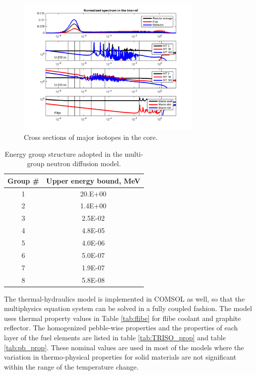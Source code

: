 \documentclass{elsarticle}
\begin{document}
\begin{figure}[h]
  \centering
  \includegraphics[width=0.8\textwidth]{./images/diffusion/tmsr/isotope_XS.png}
  \caption{Cross sections of major isotopes in the core.}
  \label{fig:xs_isotope}
\end{figure}

\begin{table}
\caption{Energy group structure adopted in the multi-group neutron diffusion model.}
  \centering
  \begin{tabular}{cc}
  Group \# & Upper energy bound, MeV\\
  \hline
  1 & 20.E+00\\
  2 & 1.4E+00\\
  3 & 2.5E-02\\
  4 & 4.8E-05\\
  5 & 4.0E-06\\
  6 & 5.0E-07\\
  7 & 1.9E-07\\
  8 & 5.8E-08\\
  \hline
  \end{tabular}
  \label{tab:egroup}
\end{table}

The thermal-hydraulics model is implemented in COMSOL as well, so that the multiphysics equation system can be solved in a fully coupled fashion. 
The model uses thermal property values in Table \ref{tab:flibe} for flibe coolant and graphite reflector. The homogenized pebble-wise properties and the properties of each layer of the fuel elements are listed in table \ref{tab:TRISO_prop} and table \ref{tab:pb_prop}. These nominal values are used in most of the models where the variation in thermo-physical properties for solid materials are not significant within the range of the temperature change. 
\end{document}
